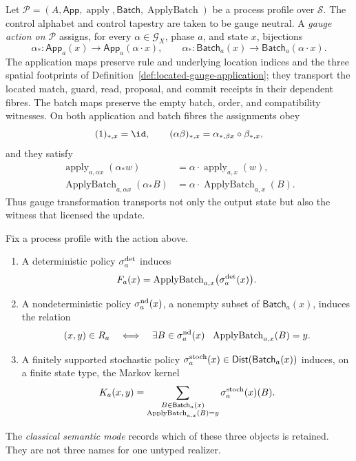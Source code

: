 \begin{definition}
\label{def:gauge-process-action}
Let $\mathcal P=(A,\mathsf{App},\operatorname{apply},
\mathsf{Batch},\operatorname{ApplyBatch})$ be a process profile over
$\mathcal S$.  The control alphabet and control tapestry are taken to be
gauge neutral.  A \emph{gauge action on $\mathcal P$} assigns, for every
$\alpha\in\mathscr G_X$, phase $a$, and state $x$, bijections
\[
 \alpha_*:\mathsf{App}_a(x)\longrightarrow
 \mathsf{App}_a(\alpha\cdot x),
 \qquad
 \alpha_*:\mathsf{Batch}_a(x)\longrightarrow
 \mathsf{Batch}_a(\alpha\cdot x).
\]
The application maps preserve rule and underlying location indices and the
three spatial footprints of
Definition~\ref{def:located-gauge-application}; they transport the located
match, guard, read, proposal, and commit receipts in their dependent fibres.  The
batch maps preserve the empty batch, order, and compatibility witnesses.
On both application and batch fibres the assignments obey
\[
 (1)_{*,x}=\id,
 \qquad
 (\alpha\beta)_{*,x}
 =\alpha_{*,\beta x}\circ\beta_{*,x},
\]
and they satisfy
\begin{align}
\operatorname{apply}_{a,\alpha x}(\alpha_*w)
   &=\alpha\cdot\operatorname{apply}_{a,x}(w), \label{eq:app-naturality}\\
 \operatorname{ApplyBatch}_{a,\alpha x}(\alpha_*B)
   &=\alpha\cdot\operatorname{ApplyBatch}_{a,x}(B).
 \label{eq:batch-naturality}
\end{align}
Thus gauge transformation transports not only the output state but also the
witness that licensed the update.
\end{definition}

\begin{definition}
\label{def:three-realizer-modes}
Fix a process profile with the action above.
\begin{enumerate}[label=\textup{(\roman*)},leftmargin=2.5em]
\item A deterministic policy $\sigma_a^{\rm det}$ induces
\[
 F_a(x)=\operatorname{ApplyBatch}_{a,x}
          \bigl(\sigma_a^{\rm det}(x)\bigr).
\]
\item A nondeterministic policy $\sigma_a^{\rm nd}(x)$, a nonempty subset of
$\mathsf{Batch}_a(x)$, induces the relation
\[
 (x,y)\in R_a
 \quad\Longleftrightarrow\quad
 \exists B\in\sigma_a^{\rm nd}(x)\ \
 \operatorname{ApplyBatch}_{a,x}(B)=y.
\]
\item A finitely supported stochastic policy
$\sigma_a^{\rm stoch}(x)\in
\mathsf{Dist}(\mathsf{Batch}_a(x))$ induces, on a finite state type, the
Markov kernel
\begin{equation}
K_a(x,y)=
 \sum_{\substack{B\in\mathsf{Batch}_a(x)\\
       \operatorname{ApplyBatch}_{a,x}(B)=y}}
       \sigma_a^{\rm stoch}(x)(B).
 \label{eq:batch-pushforward-kernel}
\end{equation}
\end{enumerate}
The \emph{classical semantic mode} records which of these three objects is
retained.  They are not three names for one untyped realizer.
\end{definition}

